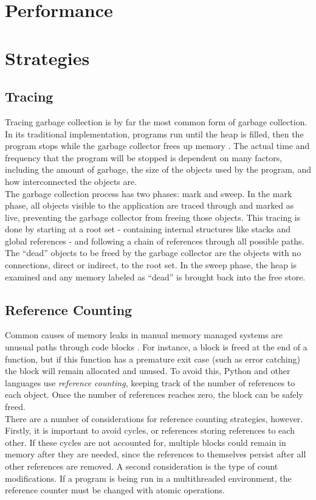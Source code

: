 \documentclass[12pt]{article}
\begin{document}
\section{Performance}

\section{Strategies}

\subsection{Tracing}
Tracing garbage collection is by far the most common form of garbage collection. In its traditional implementation, programs run until the heap is filled, then the program stops while the garbage collector frees up memory \cite{ibmJava}. The actual time and frequency that the program will be stopped is dependent on many factors, including the amount of garbage, the size of the objects used by the program, and how interconnected the objects are.\\

The garbage collection process has two phases: mark and sweep. In the mark phase, all objects visible to the application are traced through and marked as live, preventing the garbage collector from freeing those objects. This tracing is done by starting at a root set - containing internal structures like stacks and global references - and following a chain of references through all possible paths. The ``dead'' objects to be freed by the garbage collector are the objects with no connections, direct or indirect, to the root set. In the sweep phase, the heap is examined and any memory labeled as ``dead'' is brought back into the free store.
\subsection{Reference Counting}
Common causes of memory leaks in manual memory managed systems are unusual paths through code blocks \cite{pythDocs}. For instance, a block is freed at the end of a function, but if this function has a premature exit case (such as error catching) the block will remain allocated and unused. To avoid this, Python and other languages use {\it reference counting}, keeping track of the number of references to each object. Once the number of references reaches zero, the block can be safely freed.\\

There are a number of considerations for reference counting strategies, however. Firstly, it is important to avoid cycles, or references storing references to each other. If these cycles are not accounted for, multiple blocks could remain in memory after they are needed, since the references to themselves persist after all other references are removed. A second consideration is the type of count modifications. If a program is being run in a multithreaded environment, the reference counter must be changed with atomic operations.
\end{document}

